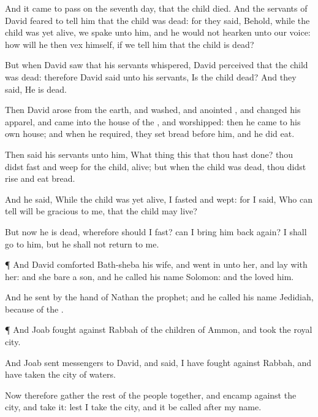 {And it came to pass on the
seventh
day, that the
child
died. And the
servants of
David
feared to
tell him that the
child was
dead: for they
said, Behold, while the
child was yet
alive, we
spake unto him, and he would not
hearken unto our
voice: how will he
then
vex
himself, if we
tell him that the
child is
dead?

But when
David
saw that his
servants
whispered,
David
perceived that the
child was
dead: therefore
David
said unto his
servants, Is the
child
dead? And they
said, He is
dead.

Then
David
arose from the
earth, and
washed, and
anointed
{}, and
changed his
apparel, and
came into the
house of the
{}, and
worshipped: then he
came to his own
house; and when he
required, they
set
bread before him, and he did
eat.

Then
said his
servants unto him, What
thing
{} this that thou hast
done? thou didst
fast and
weep for the
child,
{}
alive; but when the
child was
dead, thou didst
rise and
eat
bread.

And he
said, While the
child was yet
alive, I
fasted and
wept: for I
said, Who can
tell
{}
{} will be
gracious to me, that the
child may
live?

But now he is
dead, wherefore should I
fast?
can I bring him back
again? I shall
go to him, but he shall not
return to me.


\par }{\PP {}¶ And
David
comforted
Bath-sheba his
wife, and went
in unto her, and
lay with her: and she
bare a
son, and he
called his
name
Solomon: and the
{}
loved him.

And he
sent by the
hand of
Nathan the
prophet; and he
called his
name
Jedidiah, because of the
{}.


\par }{\PP {}¶ And
Joab
fought against
Rabbah of the
children of
Ammon, and
took the
royal
city.

And
Joab
sent
messengers to
David, and
said, I have
fought against
Rabbah, and have
taken the
city of
waters.

Now therefore
gather the
rest of the
people
together, and
encamp against the
city, and
take it: lest I
take the
city, and it be
called after my
name.

}

